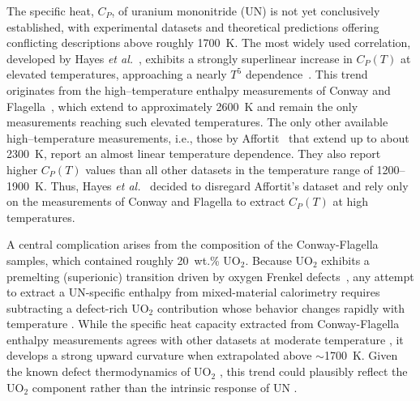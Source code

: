 \documentclass[
preprint, linenumbers,
amsmath, amssymb, aps, physrev,
]{revtex4-2}
\newcommand{\?}{\stackrel{?}{=}}
\begin{document}
The specific heat, $C_P$, of uranium mononitride (UN) is not yet conclusively established, with experimental datasets and theoretical predictions offering conflicting descriptions above roughly 1700~K. The most widely used correlation, developed by Hayes \textit{et al.}~\cite{Hayes1990IV}, exhibits a strongly superlinear increase in $C_P(T)$ at elevated temperatures, approaching a nearly $T^{5}$ dependence~\cite{AbdulHameed2024}. This trend originates from the high–temperature enthalpy measurements of Conway and Flagella~\cite{Conway1969}, which extend to approximately 2600~K and remain the only measurements reaching such elevated temperatures. The only other available high–temperature measurements, i.e., those by Affortit~\cite{Affortit1970} that extend up to about 2300~K, report an almost linear temperature dependence. They also report higher $C_P(T)$ values than all other datasets in the temperature range of 1200--1900~K. Thus, Hayes \textit{et al.}~\cite{Hayes1990IV} decided to disregard Affortit's dataset and rely only on the measurements of Conway and Flagella to extract $C_P(T)$ at high temperatures. %

A central complication arises from the composition of the Conway-Flagella samples, which contained roughly 20~wt.\% UO$_2$. Because UO$_2$ exhibits a premelting (superionic) transition driven by oxygen Frenkel defects~\cite{Pavlov2017,Cooper2014}, any attempt to extract a UN-specific enthalpy from mixed-material calorimetry requires subtracting a defect-rich UO$_2$ contribution whose behavior changes rapidly with temperature \cite{Hayes1990IV}. While the specific heat capacity extracted from Conway-Flagella enthalpy measurements agrees with other datasets at moderate temperature \cite{Hayes1990IV}, it develops a strong upward curvature when extrapolated above $\sim$1700~K. Given the known defect thermodynamics of UO$_2$ \cite{Pavlov2017,Cooper2014}, this trend could plausibly reflect the UO$_2$ component rather than the intrinsic response of UN \cite{Galvin2023}.
\end{document}
